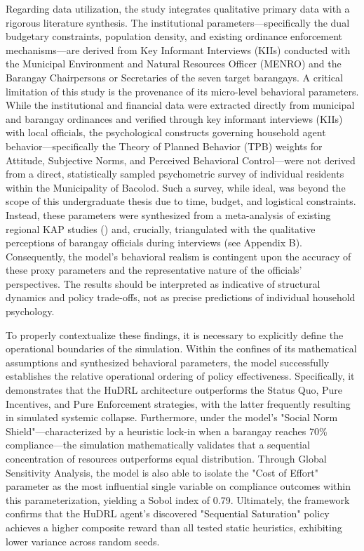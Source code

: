 Regarding data utilization, the study integrates qualitative primary data with a rigorous literature synthesis. The institutional parameters---specifically the dual budgetary constraints, population density, and existing ordinance enforcement mechanisms---are derived from Key Informant Interviews (KIIs) conducted with the Municipal Environment and Natural Resources Officer (MENRO) and the Barangay Chairpersons or Secretaries of the seven target barangays. A critical limitation of this study is the provenance of its micro-level behavioral parameters. While the institutional and financial data were extracted directly from municipal and barangay ordinances and verified through key informant interviews (KIIs) with local officials, the psychological constructs governing household agent behavior—specifically the Theory of Planned Behavior (TPB) weights for Attitude, Subjective Norms, and Perceived Behavioral Control—were not derived from a direct, statistically sampled psychometric survey of individual residents within the Municipality of Bacolod. Such a survey, while ideal, was beyond the scope of this undergraduate thesis due to time, budget, and logistical constraints. Instead, these parameters were synthesized from a meta-analysis of existing regional KAP studies (\citep{Paigalan2025}) and, crucially, triangulated with the qualitative perceptions of barangay officials during interviews (see Appendix B). Consequently, the model's behavioral realism is contingent upon the accuracy of these proxy parameters and the representative nature of the officials' perspectives. The results should be interpreted as indicative of structural dynamics and policy trade-offs, not as precise predictions of individual household psychology.

To properly contextualize these findings, it is necessary to explicitly define the operational boundaries of the simulation. Within the confines of its mathematical assumptions and synthesized behavioral parameters, the model successfully establishes the relative operational ordering of policy effectiveness. Specifically, it demonstrates that the HuDRL architecture outperforms the Status Quo, Pure Incentives, and Pure Enforcement strategies, with the latter frequently resulting in simulated systemic collapse. Furthermore, under the model's "Social Norm Shield"—characterized by a heuristic lock-in when a barangay reaches 70\% compliance—the simulation mathematically validates that a sequential concentration of resources outperforms equal distribution. Through Global Sensitivity Analysis, the model is also able to isolate the "Cost of Effort" parameter as the most influential single variable on compliance outcomes within this parameterization, yielding a Sobol index of 0.79. Ultimately, the framework confirms that the HuDRL agent's discovered "Sequential Saturation" policy achieves a higher composite reward than all tested static heuristics, exhibiting lower variance across random seeds.

